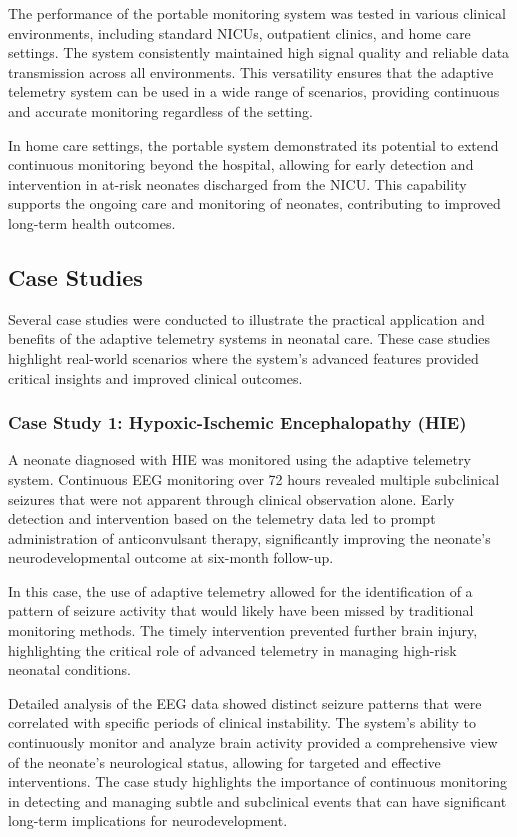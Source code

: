 \documentclass[12pt,journal,compsoc]{IEEEtran}
\begin{document}
The performance of the portable monitoring system was tested in various clinical environments, including standard NICUs, outpatient clinics, and home care settings. The system consistently maintained high signal quality and reliable data transmission across all environments. This versatility ensures that the adaptive telemetry system can be used in a wide range of scenarios, providing continuous and accurate monitoring regardless of the setting.

In home care settings, the portable system demonstrated its potential to extend continuous monitoring beyond the hospital, allowing for early detection and intervention in at-risk neonates discharged from the NICU. This capability supports the ongoing care and monitoring of neonates, contributing to improved long-term health outcomes.

\subsection{Case Studies}

Several case studies were conducted to illustrate the practical application and benefits of the adaptive telemetry systems in neonatal care. These case studies highlight real-world scenarios where the system's advanced features provided critical insights and improved clinical outcomes.

\subsubsection{Case Study 1: Hypoxic-Ischemic Encephalopathy (HIE)}

A neonate diagnosed with HIE was monitored using the adaptive telemetry system. Continuous EEG monitoring over 72 hours revealed multiple subclinical seizures that were not apparent through clinical observation alone. Early detection and intervention based on the telemetry data led to prompt administration of anticonvulsant therapy, significantly improving the neonate's neurodevelopmental outcome at six-month follow-up.

In this case, the use of adaptive telemetry allowed for the identification of a pattern of seizure activity that would likely have been missed by traditional monitoring methods. The timely intervention prevented further brain injury, highlighting the critical role of advanced telemetry in managing high-risk neonatal conditions.

Detailed analysis of the EEG data showed distinct seizure patterns that were correlated with specific periods of clinical instability. The system's ability to continuously monitor and analyze brain activity provided a comprehensive view of the neonate's neurological status, allowing for targeted and effective interventions. The case study highlights the importance of continuous monitoring in detecting and managing subtle and subclinical events that can have significant long-term implications for neurodevelopment.
\end{document}
